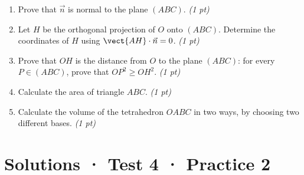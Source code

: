 \begin{enumerate}

\item Prove that $\vec n$ is normal to the plane $(ABC)$. \hfill\textit{(1 pt)}

\item Let $H$ be the orthogonal projection of $O$ onto $(ABC)$. Determine the coordinates of $H$ using $\vect{AH}\cdot\vec n=0$. \hfill\textit{(1 pt)}

\item Prove that $OH$ is the distance from $O$ to the plane $(ABC)$: for every $P\in(ABC)$, prove that $OP^2\ge OH^2$. \hfill\textit{(1 pt)}

\item Calculate the area of triangle $ABC$. \hfill\textit{(1 pt)}

\item Calculate the volume of the tetrahedron $OABC$ in two ways, by choosing two different bases. \hfill\textit{(1 pt)}

\end{enumerate}

\ifmxteacher\mxnewpage

\section*{Solutions · Test 4 · Practice 2}\label{cor:6-2}

